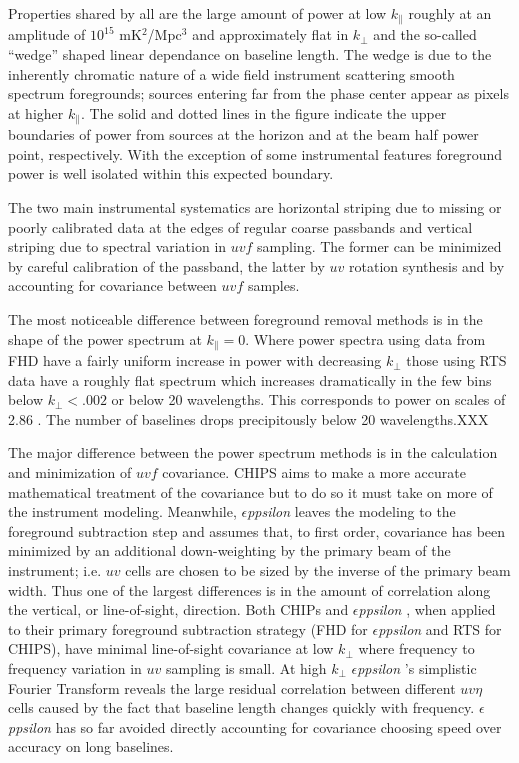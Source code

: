 \documentclass[preprint]{aastex}
\def\eppsilon{{\it $\epsilon$ppsilon }}
\begin{document}
Properties shared by all are the large amount of power at low $k_{\parallel}$ roughly at an amplitude of $10^15$ mK$^2$/Mpc$^3$ and approximately flat in $k_{\perp}$ and the so-called ``wedge'' shaped linear dependance on baseline length.  The wedge is due to the inherently chromatic nature of a wide field instrument scattering smooth spectrum foregrounds; sources entering far from the phase center appear as pixels at higher $k_\parallel$. The solid and dotted lines in the figure indicate the upper boundaries of power from sources at the horizon and at the beam half power point, respectively.  With the exception of some instrumental features foreground power is well isolated within this expected boundary.

The two main instrumental systematics are horizontal striping due to missing or poorly calibrated data at the edges of regular coarse passbands and vertical striping due to spectral variation in $uvf$ sampling. The former can be minimized by careful calibration of the passband, the latter by $uv$ rotation synthesis and by accounting for covariance between $uvf$ samples. 

The most noticeable difference between foreground removal methods is in the shape of the power spectrum at $k_\parallel=0$.  Where power spectra using data from FHD have a fairly uniform increase in power with decreasing $k_\perp$ those using RTS data have a roughly flat spectrum which increases dramatically in the few bins below $k_\perp<.002$ or below 20 wavelengths.  This corresponds to power on scales of 2.86 \arcdeg. The number of baselines drops precipitously below 20 wavelengths.XXX 

The major difference between the power spectrum methods is in the calculation and minimization of $uvf$ covariance.   CHIPS aims to make a more accurate mathematical treatment of the covariance but to do so it must take on more of the instrument modeling. Meanwhile, \eppsilon leaves the modeling to the foreground subtraction step and assumes that, to first order, covariance has been minimized by an  additional down-weighting by the primary beam of the instrument;  i.e. $uv$ cells are chosen to be sized by the inverse of the primary beam width.  Thus one of the largest differences is in the amount of correlation along the vertical, or line-of-sight, direction.  Both CHIPs and \eppsilon, when applied to their  primary foreground subtraction strategy (FHD for \eppsilon and RTS for CHIPS), have minimal line-of-sight covariance at low $k_\perp$ where frequency to frequency variation in $uv$ sampling is small. At high $k_\perp$ \eppsilon's simplistic Fourier Transform reveals the large residual correlation between different $uv\eta$ cells caused by the fact that baseline length changes quickly with frequency.  \eppsilon has so far avoided directly accounting for covariance choosing speed over accuracy on long baselines.
\end{document}
